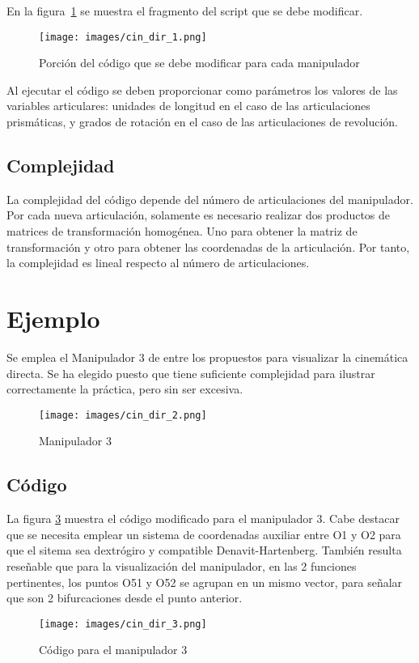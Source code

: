 En la figura~\ref{chapter:intro2} se muestra el fragmento del script que se debe modificar.
\begin{figure}[htb]
   \centering
   \texttt{[image: images/cin\_dir\_1.png]}
   \caption{Porción del código que se debe modificar para cada manipulador}
   \label{chapter:intro2}
\end{figure}

\bigskip Al ejecutar el código se deben proporcionar como parámetros los valores de las variables articulares: unidades de longitud en el caso de las articulaciones prismáticas, y grados de rotación en el caso de las articulaciones de revolución. 

\subsection{Complejidad}
La complejidad del código depende del número de articulaciones del manipulador. Por cada nueva articulación, solamente es necesario realizar dos productos de matrices de transformación homogénea. Uno para obtener la matriz de transformación y otro para obtener las coordenadas de la articulación. Por tanto, la complejidad es lineal respecto al número de articulaciones.
\section{Ejemplo}
Se emplea el Manipulador 3 de entre los propuestos para visualizar la cinemática directa. Se ha elegido puesto que tiene suficiente complejidad para ilustrar correctamente la práctica, pero sin ser excesiva.
\begin{figure}[htb]
   \centering
   \texttt{[image: images/cin\_dir\_2.png]}
   \caption{Manipulador 3}
   \label{chapter:manipulador3}
\end{figure}

\subsection{Código}
La figura \ref{chapter:codigo2} muestra el código modificado para el manipulador 3.
Cabe destacar que se necesita emplear un sistema de coordenadas auxiliar entre O1 y O2 para que el sitema sea dextrógiro y compatible Denavit-Hartenberg.
También resulta reseñable que para la visualización del manipulador, en las 2 funciones pertinentes, los puntos O51 y O52 se agrupan en un mismo vector, para señalar que son 2 bifurcaciones desde el punto anterior. 
\begin{figure}[htb]
   \centering
   \texttt{[image: images/cin\_dir\_3.png]}
   \caption{Código para el manipulador 3}
   \label{chapter:codigo2}
\end{figure}

